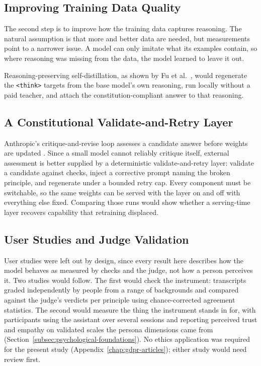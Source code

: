 \subsection{Improving Training Data Quality}
\label{subsec:conclusion-future-data}

The second step is to improve how the training data captures reasoning. The natural assumption is that more and better data are needed, but measurements point to a narrower issue. A model can only imitate what its examples contain, so where reasoning was missing from the data, the model learned to leave it out.

Reasoning-preserving self-distillation, as shown by Fu et al.\ \cite{fu2026reducingsafetytaxllm}, would regenerate the \texttt{<think>} targets from the base model's own reasoning, run locally without a paid teacher, and attach the constitution-compliant answer to that reasoning. 

\subsection{A Constitutional Validate-and-Retry Layer}
\label{subsec:conclusion-future-validate-retry}

Anthropic's critique-and-revise loop assesses a candidate answer before weights are updated \cite{bai2022constitutionalaiharmlessnessai}. Since a small model cannot reliably critique itself, external assessment is better supplied by a deterministic validate-and-retry layer: validate a candidate against checks, inject a corrective prompt naming the broken principle, and regenerate under a bounded retry cap. Every component must be switchable, so the same weights can be served with the layer on and off with everything else fixed. Comparing those runs would show whether a serving-time layer recovers capability that retraining displaced.

\subsection{User Studies and Judge Validation}
\label{subsec:conclusion-future-user-studies}

User studies were left out by design, since every result here describes how the model behaves as measured by checks and the judge, not how a person perceives it. Two studies would follow. The first would check the instrument: transcripts graded independently by people from a range of backgrounds and compared against the judge's verdicts per principle using chance-corrected agreement statistics. The second would measure the thing the instrument stands in for, with participants using the assistant over several sessions and reporting perceived trust and empathy on validated scales the persona dimensions came from (Section~\ref{subsec:psychological-foundations}). No ethics application was required for the present study (Appendix~\ref{chap:gdpr-articles}); either study would need review first.

